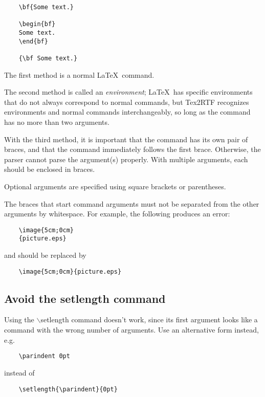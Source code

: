 \begin{verbatim}
    \bf{Some text.}

    \begin{bf}
    Some text.
    \end{bf}

    {\bf Some text.}
\end{verbatim}

The first method is a normal \LaTeX\ command.

The second method is called an {\it environment}; \LaTeX\ has specific
environments that do not always correspond to normal commands, but
Tex2RTF recognizes environments and normal commands interchangeably, so
long as the command has no more than two arguments.

With the third method, it is important that the command has its own
pair of braces, and that the command immediately follows the first brace.
Otherwise, the parser cannot parse the argument(s) properly.
With multiple arguments, each should be enclosed in braces.

Optional arguments are specified using square brackets or parentheses.

The braces that start command arguments must not be separated from
the other arguments by whitespace. For example, the following produces
an error:

\begin{verbatim}
    \image{5cm;0cm}
    {picture.eps}
\end{verbatim}

and should be replaced by 

\begin{verbatim}
    \image{5cm;0cm}{picture.eps}
\end{verbatim}

\subsection{Avoid the setlength command}

Using the $\backslash$setlength command doesn't work, since its first
argument looks like a command with the wrong number of arguments. Use an
alternative form instead, e.g.

\begin{verbatim}
    \parindent 0pt
\end{verbatim}

instead of

\begin{verbatim}
    \setlength{\parindent}{0pt}
\end{verbatim}

